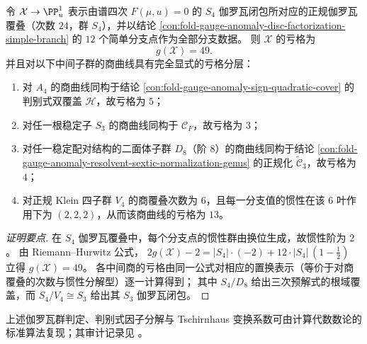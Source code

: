\begin{conclusion}\label{con:fold-gauge-anomaly-s4-hurwitz-tower-genus}
令 \(\mathcal X\to\PP^1_u\) 表示由谱四次 \(F(\mu,u)=0\) 的 \(S_4\) 伽罗瓦闭包所对应的正规伽罗瓦覆叠（次数 \(24\)，群 \(S_4\)），并以结论 \ref{con:fold-gauge-anomaly-disc-factorization-simple-branch} 的 \(12\) 个简单分支点作为全部分支数据。
则 \(\mathcal X\) 的亏格为
\[
g(\mathcal X)=49.
\]
并且对以下中间子群的商曲线具有完全显式的亏格分层：
\begin{enumerate}
  \item 对 \(A_4\) 的商曲线同构于结论 \ref{con:fold-gauge-anomaly-sign-quadratic-cover} 的判别式双覆盖 \(\mathcal H\)，故亏格为 \(5\)；
  \item 对任一根稳定子 \(S_3\) 的商曲线同构于 \(\mathcal C_F\)，故亏格为 \(3\)；
  \item 对任一稳定配对结构的二面体子群 \(D_8\)（阶 \(8\)）的商曲线同构于结论 \ref{con:fold-gauge-anomaly-resolvent-sextic-normalization-genus} 的正规化 \(\widetilde{\mathcal C}_3\)，故亏格为 \(4\)；
  \item 对正规 Klein 四子群 \(V_4\) 的商覆叠次数为 \(6\)，且每一分支值的惯性在该 \(6\) 叶作用下为 \((2,2,2)\)，从而该商曲线的亏格为 \(13\)。
\end{enumerate}
\end{conclusion}
\begin{proof}[证明要点]
在 \(S_4\) 伽罗瓦覆叠中，每个分支点的惯性群由换位生成，故惯性阶为 \(2\)。
由 Riemann--Hurwitz 公式，
\(
2g(\mathcal X)-2=|S_4|\cdot(-2)+12\cdot|S_4|\,(1-\tfrac12)
\)
立得 \(g(\mathcal X)=49\)。
各中间商的亏格由同一公式对相应的置换表示（等价于对商覆叠的次数与惯性分解型）逐一计算得到；
其中 \(S_4/D_8\) 给出三次预解式的根域覆盖，而 \(S_4/V_4\cong S_3\) 给出其 \(S_3\) 伽罗瓦闭包。
\end{proof}

\begin{remark}[计算审计来源]\label{rem:fold-gauge-anomaly-spectral-curve-arithmetic-audit}
上述伽罗瓦群判定、判别式因子分解与 Tschirnhaus 变换系数可由计算代数数论的标准算法复现；其审计记录见 \cite{Internal2026FoldGaugeAnomalySpectralCurveArithmeticAudit20260218}。
\end{remark}

